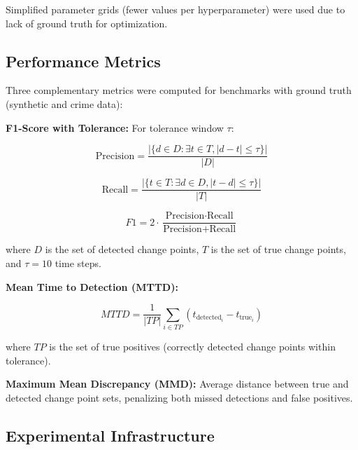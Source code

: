 \documentclass[journal,article,submit,pdftex,moreauthors]{Definitions/mdpi}
\begin{document}
Simplified parameter grids (fewer values per hyperparameter) were used due to lack of ground truth for optimization.

\subsection{Performance Metrics}

Three complementary metrics were computed for benchmarks with ground truth (synthetic and crime data):

\textbf{F1-Score with Tolerance:} For tolerance window $\tau$:
\begin{linenomath}
\begin{equation}
\text{Precision} = \frac{|\{d \in D : \exists t \in T, |d-t| \leq \tau\}|}{|D|}
\end{equation}
\end{linenomath}

\begin{linenomath}
\begin{equation}
\text{Recall} = \frac{|\{t \in T : \exists d \in D, |t-d| \leq \tau\}|}{|T|}
\end{equation}
\end{linenomath}

\begin{linenomath}
\begin{equation}
F1 = 2 \cdot \frac{\text{Precision} \cdot \text{Recall}}{\text{Precision} + \text{Recall}}
\end{equation}
\end{linenomath}

where $D$ is the set of detected change points, $T$ is the set of true change points, and $\tau = 10$ time steps.

\textbf{Mean Time to Detection (MTTD):}
\begin{linenomath}
\begin{equation}
MTTD = \frac{1}{|TP|} \sum_{i \in TP} (t_{\text{detected}_i} - t_{\text{true}_i})
\end{equation}
\end{linenomath}

where $TP$ is the set of true positives (correctly detected change points within tolerance).

\textbf{Maximum Mean Discrepancy (MMD):} Average distance between true and detected change point sets, penalizing both missed detections and false positives.

\subsection{Experimental Infrastructure}
\end{document}
